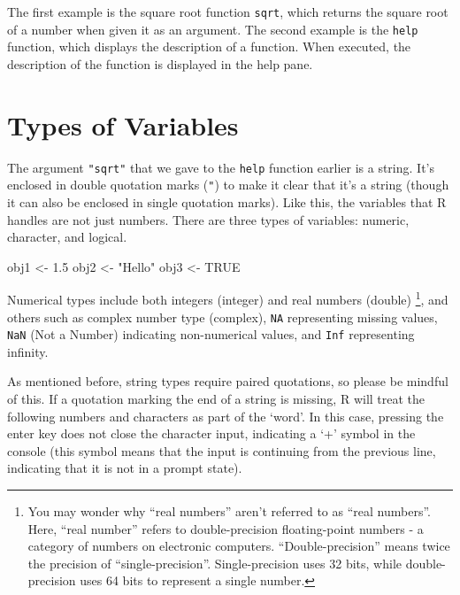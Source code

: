 \documentclass[
  a4paper,
]{book}
\newenvironment{Shaded}{\begin{snugshade}}{\end{snugshade}}
\newcommand{\ConstantTok}[1]{\textcolor[rgb]{0.56,0.35,0.01}{#1}}
\newcommand{\FloatTok}[1]{\textcolor[rgb]{0.68,0.00,0.00}{#1}}
\newcommand{\NormalTok}[1]{\textcolor[rgb]{0.00,0.23,0.31}{#1}}
\newcommand{\OtherTok}[1]{\textcolor[rgb]{0.00,0.23,0.31}{#1}}
\newcommand{\StringTok}[1]{\textcolor[rgb]{0.13,0.47,0.30}{#1}}
\begin{document}
The first example is the square root function \texttt{sqrt}, which
returns the square root of a number when given it as an argument. The
second example is the \texttt{help} function, which displays the
description of a function. When executed, the description of the
function is displayed in the help pane.

\section{Types of Variables}\label{types-of-variables}

The argument \texttt{"sqrt"} that we gave to the \texttt{help} function
earlier is a string. It's enclosed in double quotation marks
(\texttt{"}) to make it clear that it's a string (though it can also be
enclosed in single quotation marks). Like this, the variables that R
handles are not just numbers. There are three types of variables:
numeric, character, and logical.

\begin{Shaded}
\begin{Highlighting}[]
\NormalTok{obj1 }\OtherTok{\textless{}{-}} \FloatTok{1.5}
\NormalTok{obj2 }\OtherTok{\textless{}{-}} \StringTok{"Hello"}
\NormalTok{obj3 }\OtherTok{\textless{}{-}} \ConstantTok{TRUE}
\end{Highlighting}
\end{Shaded}

Numerical types include both integers (integer) and real numbers
(double) \footnote{You may wonder why ``real numbers'' aren't referred
  to as ``real numbers''. Here, ``real number'' refers to
  double-precision floating-point numbers - a category of numbers on
  electronic computers. ``Double-precision'' means twice the precision
  of ``single-precision''. Single-precision uses 32 bits, while
  double-precision uses 64 bits to represent a single number.}, and
others such as complex number type (complex), \texttt{NA} representing
missing values, \texttt{NaN} (Not a Number) indicating non-numerical
values, and \texttt{Inf} representing infinity.

As mentioned before, string types require paired quotations, so please
be mindful of this. If a quotation marking the end of a string is
missing, R will treat the following numbers and characters as part of
the `word'. In this case, pressing the enter key does not close the
character input, indicating a `+' symbol in the console (this symbol
means that the input is continuing from the previous line, indicating
that it is not in a prompt state).
\end{document}
